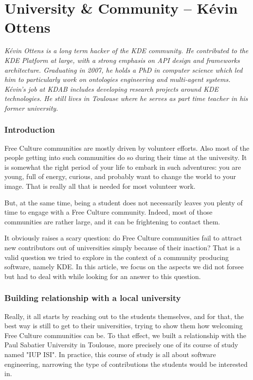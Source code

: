 \chapter{University \& Community -- Kévin Ottens}

\textit{Kévin Ottens is a long term hacker of the KDE community. He contributed to the KDE Platform at large, with a strong emphasis on API design and frameworks architecture. Graduating in 2007, he holds a PhD in computer science which led him to particularly work on ontologies engineering and multi-agent systems. Kévin's job at KDAB includes developing research projects around KDE technologies. He still lives in Toulouse where he serves as part time teacher in his former university.}

\subsection*{Introduction}
Free Culture communities are mostly driven by volunteer efforts. Also most of the people getting into such communities do so during their time at the university. It is somewhat the right period of your life to embark in such adventures: you are young, full of energy, curious, and probably want to change the world to your image. That is really all that is needed for most volunteer work.

But, at the same time, being a student does not necessarily leaves you plenty of time to engage with a Free Culture community. Indeed, most of those communities are rather large, and it can be frightening to contact them.

It obviously raises a scary question: do Free Culture communities fail to attract new contributors out of universities simply because of their inaction? That is a valid question we tried to explore in the context of a community producing software, namely KDE. In this article, we focus on the aspects we did not forsee but had to deal with while looking for an answer to this question.

\subsection*{Building relationship with a local university}
Really, it all starts by reaching out to the students themselves, and for that, the best way is still to get to their universities, trying to show them how welcoming Free Culture communities can be. To that effect, we built a relationship with the Paul Sabatier University in Toulouse, more precisely one of its course of study named "IUP ISI". In practice, this course of study is all about software engineering, narrowing the type of contributions the students would be interested in.

